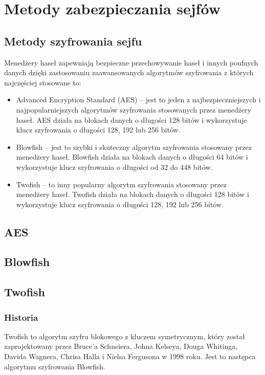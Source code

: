 \section{Metody zabezpieczania sejfów}

\subsection{Metody szyfrowania sejfu}

Menedżery haseł zapewniają bezpieczne przechowywanie haseł i innych poufnych danych dzięki zastosowaniu zaawansowanych algorytmów szyfrowania z których najczęściej stosowane to:

\begin{itemize}
    \item Advanced Encryption Standard (AES) – jest to jeden z najbezpieczniejszych i najpopularniejszych algorytmów szyfrowania stosowanych przez menedżery haseł. AES działa na blokach danych o długości 128 bitów i wykorzystuje klucz szyfrowania o długości 128, 192 lub 256 bitów.
    \item Blowfish – jest to szybki i skuteczny algorytm szyfrowania stosowany przez menedżery haseł. Blowfish działa na blokach danych o długości 64 bitów i wykorzystuje klucz szyfrowania o długości od 32 do 448 bitów.
    \item Twofish – to inny popularny algorytm szyfrowania stosowany przez menedżery haseł. Twofish działa na blokach danych o długości 128 bitów i wykorzystuje klucz szyfrowania o długości 128, 192 lub 256 bitów.
  \end{itemize}

\subsection{AES}

\subsection{Blowfish}

\subsection{Twofish}
\subsubsection{Historia}
Twofish to algorytm szyfru blokowego z kluczem symetrycznym, który został zaprojektowany przez Bruce'a Schneiera, Johna Kelseya, Douga Whitinga, Davida Wagnera, Chrisa Halla i Nielsa Fergusona w 1998 roku. Jest to następca algorytmu szyfrowania Blowfish.
